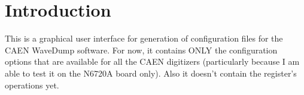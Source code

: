 \section{Introduction}
This is a graphical user interface for generation of configuration files for the CAEN
WaveDump software. For now, it contains ONLY the configuration options that are
available for all the CAEN digitizers (particularly because I am able to test it on the
N6720A board only). Also it doesn't contain the register's operations yet.
